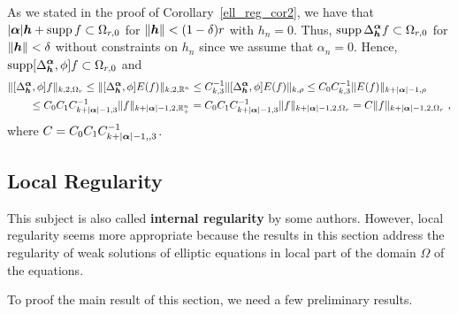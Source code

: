 \begin{rmk}
As we stated in the proof of Corollary~\ref{ell_reg_cor2},
we have that $|{\bm{\alpha}}| {\bm{h}} + \operatorname{supp} f \subset \Omega_{r,0}$
for $\|{\bm{h}}\| < (1-\delta)r$ with $h_n = 0$.    Thus,
$\displaystyle \operatorname{supp} \Delta^{{\bm{\alpha}}}_{{\bm{h}}} f \subset \Omega_{r,0}$ for
$\|{\bm{h}}\| < \delta$ without constraints on $h_n$ since we assume
that $\alpha_n = 0$.  Hence,
$\displaystyle \operatorname{supp} [\Delta^{{\bm{\alpha}}}_{{\bm{h}}}, \phi] f
\subset \Omega_{r,0}$
and
\begin{align*}
&\| [\Delta^{{\bm{\alpha}}}_{{\bm{h}}}, \phi] f \|_{k,2,\Omega_r}
\leq \| [\Delta^{{\bm{\alpha}}}_{{\bm{h}}}, \phi] E(f) \|_{k,2,\mathbb{R}^n}
\leq C_{k,3}^{-1} \| [\Delta^{{\bm{\alpha}}}_{{\bm{h}}}, \phi] E(f) \|_{k,\rho}
\leq C_0 C_{k,3}^{-1} \| E(f) \|_{k+|{\bm{\alpha}}|-1,\rho} \\
&\qquad \leq C_0 C_1 C_{k+|{\bm{\alpha}}|-1,3}^{-1}
\| f \|_{k+|{\bm{\alpha}}|-1,2,\mathbb{R}^n_+}
= C_0 C_1 C_{k+|{\bm{\alpha}}|-1,3}^{-1} \| f \|_{k+|{\bm{\alpha}}|-1,2,\Omega_r}
= C \| f \|_{k+|{\bm{\alpha}}|-1,2,\Omega_r} \ ,
\end{align*}
where $C = C_0 C_1 C_{k+|{\bm{\alpha}}|-1,,3}^{-1}$.
\end{rmk}

\subsection{Local Regularity} 

This subject is also called {\bfseries internal
regularity} by some authors.  However,
local regularity seems more appropriate because the results
in this section address the regularity of weak solutions of elliptic
equations in local part of the domain $\Omega$ of the equations.

To proof the main result of this section, we need a few preliminary results.

